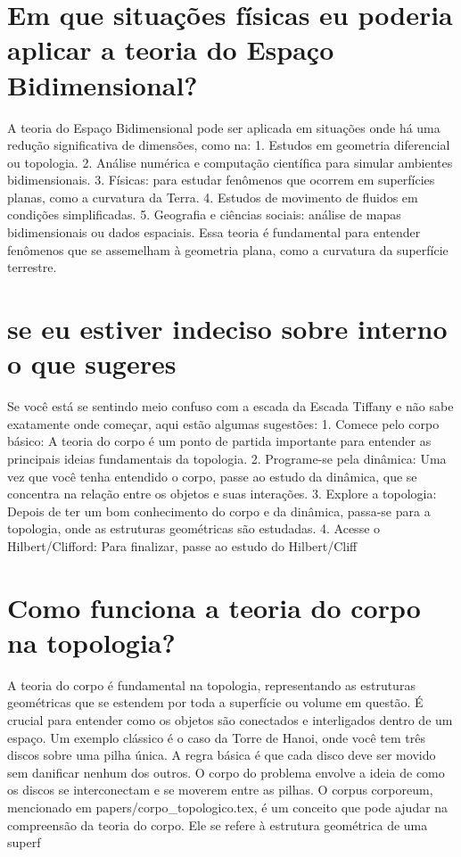 \documentclass[11pt,a4paper]{article}
\begin{document}
\section{Em que situações físicas eu poderia aplicar a teoria do Espaço Bidimensional?}
A teoria do Espaço Bidimensional pode ser aplicada em situações onde há uma redução significativa de dimensões, como na: 1. Estudos em geometria diferencial ou topologia. 2. Análise numérica e computação científica para simular ambientes bidimensionais. 3. Físicas: para estudar fenômenos que ocorrem em superfícies planas, como a curvatura da Terra. 4. Estudos de movimento de fluidos em condições simplificadas. 5. Geografia e ciências sociais: análise de mapas bidimensionais ou dados espaciais. Essa teoria é fundamental para entender fenômenos que se assemelham à geometria plana, como a curvatura da superfície terrestre.

\section{se eu estiver indeciso sobre interno o que sugeres}
Se você está se sentindo meio confuso com a escada da Escada Tiffany e não sabe exatamente onde começar, aqui estão algumas sugestões: 1. Comece pelo corpo básico: A teoria do corpo é um ponto de partida importante para entender as principais ideias fundamentais da topologia. 2. Programe-se pela dinâmica: Uma vez que você tenha entendido o corpo, passe ao estudo da dinâmica, que se concentra na relação entre os objetos e suas interações. 3. Explore a topologia: Depois de ter um bom conhecimento do corpo e da dinâmica, passa-se para a topologia, onde as estruturas geométricas são estudadas. 4. Acesse o Hilbert/Clifford: Para finalizar, passe ao estudo do Hilbert/Cliff

\section{Como funciona a teoria do corpo na topologia?}
A teoria do corpo é fundamental na topologia, representando as estruturas geométricas que se estendem por toda a superfície ou volume em questão. É crucial para entender como os objetos são conectados e interligados dentro de um espaço. Um exemplo clássico é o caso da Torre de Hanoi, onde você tem três discos sobre uma pilha única. A regra básica é que cada disco deve ser movido sem danificar nenhum dos outros. O corpo do problema envolve a ideia de como os discos se interconectam e se moverem entre as pilhas. O corpus corporeum, mencionado em papers/corpo\_topologico.tex, é um conceito que pode ajudar na compreensão da teoria do corpo. Ele se refere à estrutura geométrica de uma superf
\end{document}

